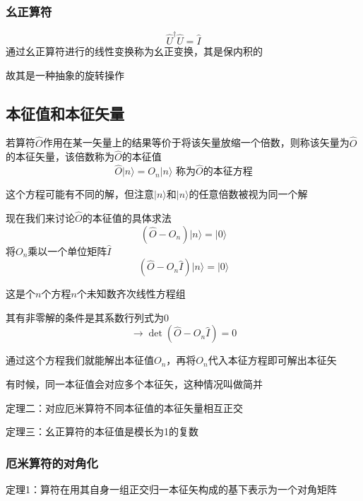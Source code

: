 \documentclass[lang=cn,10pt]{elegantbook}
\begin{document}
\subsubsection{幺正算符}

\begin{equation*}
	\hat{U}^{\dagger}\hat{U}=\hat{I}
\end{equation*}
通过幺正算符进行的线性变换称为幺正变换，其是保内积的

故其是一种抽象的旋转操作
\subsection{本征值和本征矢量}

若算符$\hat{O}$作用在某一矢量上的结果等价于将该矢量放缩一个倍数，则称该矢量为$\hat{O}$的本征矢量，该倍数称为$\hat{O}$的本征值
\begin{equation*}
	\hat{O}|n\rangle =O_n|n\rangle \,\,\text{称为}\hat{O}\text{的本征方程}
\end{equation*}

这个方程可能有不同的解，但注意$|n\rangle $和$|n\rangle $的任意倍数被视为同一个解

现在我们来讨论$\hat{O}$的本征值的具体求法
\begin{equation*}
	(\hat{O}-O_n)|n\rangle=|0\rangle
\end{equation*}
将$O_n$乘以一个单位矩阵$\hat{I}$
\begin{equation*}
	(\hat{O}-O_n\hat{I})|n\rangle=|0\rangle
\end{equation*}

这是个$n$个方程$n$个未知数齐次线性方程组

其有非零解的条件是其系数行列式为0
\begin{equation*}
	\rightarrow \det(\hat{O}-O_n\hat{I})=0
\end{equation*}

通过这个方程我们就能解出本征值$O_n$，再将$O_n$代入本征方程即可解出本征矢

有时候，同一本征值会对应多个本征矢，这种情况叫做简并

定理二：对应厄米算符不同本征值的本征矢量相互正交

定理三：幺正算符的本征值是模长为1的复数

\subsubsection{厄米算符的对角化}
定理1：算符在用其自身一组正交归一本征矢构成的基下表示为一个对角矩阵
\end{document}
